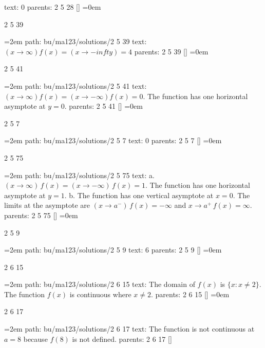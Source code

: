 \smallskip
text:  0
\smallskip
parents:  2 5 28 []
\smallskip
\leftskip=0em
\par\endgroup
\bigskip
{}
2 5 39
\smallskip
\par\begingroup
\leftskip=2em
path: bu/ma123/solutions/2 5 39
\smallskip
text:  $(x \to \infty) f(x) = (x \to -infty) = 4$
\smallskip
parents:  2 5 39 []
\smallskip
\leftskip=0em
\par\endgroup
\bigskip
{}
2 5 41
\smallskip
\par\begingroup
\leftskip=2em
path: bu/ma123/solutions/2 5 41
\smallskip
text:  $(x \to \infty)f(x) = (x \to -\infty)f(x) = 0$. The function has one horizontal asymptote at $y = 0$.
\smallskip
parents:  2 5 41 []
\smallskip
\leftskip=0em
\par\endgroup
\bigskip
{}
2 5 7
\smallskip
\par\begingroup
\leftskip=2em
path: bu/ma123/solutions/2 5 7
\smallskip
text:  0
\smallskip
parents:  2 5 7 []
\smallskip
\leftskip=0em
\par\endgroup
\bigskip
{}
2 5 75
\smallskip
\par\begingroup
\leftskip=2em
path: bu/ma123/solutions/2 5 75
\smallskip
text:  a. $(x \to \infty) \, f(x) = (x \to -\infty) \, f(x) = 1$. The function has one horizontal asymptote at $y = 1$. b. The function has one vertical asymptote at $x = 0$. The limits at the asymptote are $(x \to a^{-})\, f(x) = -\infty$ and $x \to a^{+} \, f(x) = \infty$.
\smallskip
parents:  2 5 75 []
\smallskip
\leftskip=0em
\par\endgroup
\bigskip
{}
2 5 9
\smallskip
\par\begingroup
\leftskip=2em
path: bu/ma123/solutions/2 5 9
\smallskip
text:  6
\smallskip
parents:  2 5 9 []
\smallskip
\leftskip=0em
\par\endgroup
\bigskip
{}
2 6 15
\smallskip
\par\begingroup
\leftskip=2em
path: bu/ma123/solutions/2 6 15
\smallskip
text:  The domain of $f(x)$ is $\{x: x \ne 2\}$. The function $f(x)$ is continuous where $x \ne 2$.
\smallskip
parents:  2 6 15 []
\smallskip
\leftskip=0em
\par\endgroup
\bigskip
{}
2 6 17
\smallskip
\par\begingroup
\leftskip=2em
path: bu/ma123/solutions/2 6 17
\smallskip
text:  The function is not continuous at $a = 8$ because $f(8)$ is not defined.
\smallskip
parents:  2 6 17 []
\smallskip
